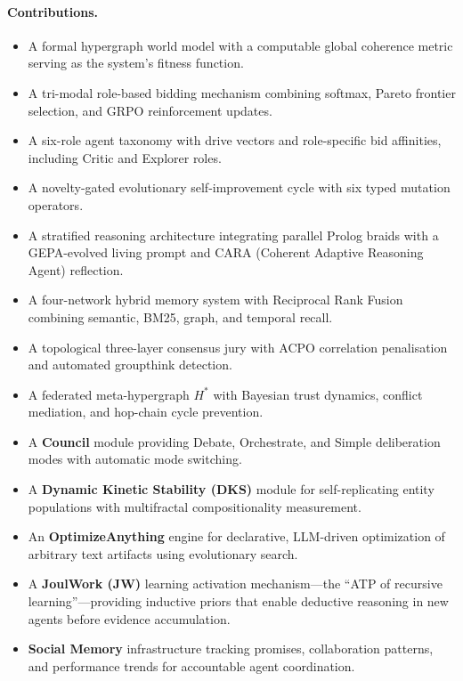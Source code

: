 \documentclass[11pt]{article}
\begin{document}
\paragraph{Contributions.}
\begin{itemize}[noitemsep,topsep=4pt]
  \item A formal hypergraph world model with a computable global coherence metric
        serving as the system's fitness function.
  \item A tri-modal role-based bidding mechanism combining softmax, Pareto frontier
        selection, and GRPO reinforcement updates.
  \item A six-role agent taxonomy with drive vectors and role-specific bid
        affinities, including Critic and Explorer roles.
  \item A novelty-gated evolutionary self-improvement cycle with six typed mutation
        operators.
  \item A stratified reasoning architecture integrating parallel Prolog braids with
        a GEPA-evolved living prompt and CARA (Coherent Adaptive Reasoning Agent) reflection.
  \item A four-network hybrid memory system with Reciprocal Rank Fusion combining
        semantic, BM25, graph, and temporal recall.
  \item A topological three-layer consensus jury with ACPO correlation penalisation
        and automated groupthink detection.
  \item A federated meta-hypergraph $H^*$ with Bayesian trust dynamics, conflict
        mediation, and hop-chain cycle prevention.
  \item A \textbf{Council} module providing Debate, Orchestrate, and Simple
        deliberation modes with automatic mode switching.
  \item A \textbf{Dynamic Kinetic Stability (DKS)} module for self-replicating
        entity populations with multifractal compositionality measurement.
  \item An \textbf{OptimizeAnything} engine for declarative, LLM-driven
        optimization of arbitrary text artifacts using evolutionary search.
  \item A \textbf{JoulWork (JW)} learning activation mechanism---the
        ``ATP of recursive learning''---providing inductive priors that enable
        deductive reasoning in new agents before evidence accumulation.
  \item \textbf{Social Memory} infrastructure tracking promises, collaboration
        patterns, and performance trends for accountable agent coordination.

\end{itemize}
\end{document}

